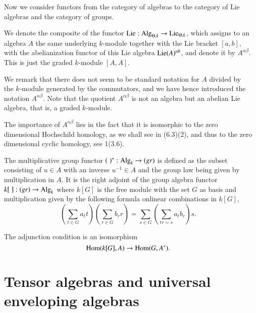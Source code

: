 Now we consider functors from the category of algebras to the category
of Lie algebras and the category of groups.

\begin{notation}\label{chap2-not3.3}
We denote the composite of the functor $\operatorname{Lie}:\operatorname{Alg}_{\Theta,k}\to
\operatorname{Lie}_{\Theta,k}$, which assigns to an algebra $A$ the same underlying
$k$-module together with the Lie bracket $[a,b]$, with the
abelianization functor of this Lie algebra $\operatorname{Lie}(A)^{ab}$, and denote
it by $A^{\alpha\beta}$. This is just the graded $k$-module $[A,A]$.
\end{notation}

We remark that there does not seem to be standard notation for $A$
divided by the $k$-module generated by the commutators, and we have
hence introduced the notation $A^{\alpha\beta}$. Note that the
quotient $A^{\alpha\beta}$ is not an algebra but an abelian Lie
algebra, that is, a graded $k$-module.

\begin{remark}\label{chap2-rem3.4}
The importance of $A^{\alpha\beta}$ lies in the fact that it is
isomorphic to the zero dimensional Hochschild homology, as we shall
see in (6.3)(2), and thus to the zero dimensional cyclic homology, see
1(3.6). 
\end{remark}

\begin{remark}\label{chap2-rem3.5}
The multiplicative group functor $(\;)^{*}:\operatorname{Alg}_{k}\to (gr)$ is
defined as the subset consisting of $u\in A$ with an inverse
$u^{-1}\in A$ and the group law being given by multiplication in
$A$. It is the right adjoint of the group algebra functor
$k[\;]:(gr)\to \operatorname{Alg}_{k}$ where $k[G]$ is the free module with the set
$G$ as basis and multiplication given by the following formula
on\pageoriginale linear combinations in $k[G]$,
$$
\left(\sum_{t\in G}a_{t}t\right) \left(\sum_{r\in
  G}b_{r}r\right)=\sum_{s\in G} \left(\sum_{tr=s}a_{t}b_{r}\right)s.
$$

The adjunction condition is an isomorphism
$$
\operatorname{Hom}(k[G],A)\to \operatorname{Hom}(G,A^{*}).
$$
\end{remark}

\section[Tensor algebras and universal enveloping
  algebras]{Tensor algebras and universal enveloping\hfil\break
  algebras}\label{chap2-sec4}

